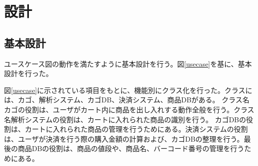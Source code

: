 \section{設計}
\subsection*{基本設計}

ユースケース図の動作を満たすように基本設計を行う。図\ref{usecase}を基に、基本設計を行った。

図\ref{usecase}に示されている項目をもとに、機能別にクラス化を行った。クラスには、カゴ、解析システム、カゴDB、決済システム、商品DBがある。
クラス名カゴの役割は、ユーザがカート内に商品を出し入れする動作全般を行う。クラス名解析システムの役割は、カートに入れられた商品の識別を行う。
カゴDBの役割は、カートに入れられた商品の管理を行うためにある。決済システムの役割は、ユーザが決済を行う際の購入金額の計算および、カゴDBの整理を行う。最後の商品DBの役割は、商品の値段や、商品名、バーコード番号の管理を行うためにある。